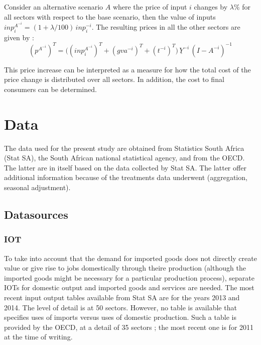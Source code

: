\documentclass[12pt,english]{article}
\begin{document}
Consider an alternative scenario $A$ where the price of input $i$ changes by $\lambda\%$ for all sectors with respect to the base scenario, then the value of inputs $inp^{A^{-i}}_{i} = (1+\lambda/100)\, inp^{-i}_i$. The resulting prices in all the other sectors are given by :
\begin{equation}
(p^{A^{-i}})^T  =  \Big((inp^{A^{-i}}_i)^T + (gva^{-i})^T + (t^{-i})^T \Big)\, \underline{Y}^{-i} \, (I - A^{-i})^{-1} \label{cost-push-scen}
\end{equation}

This price increase can be interpreted as a measure for how the total cost of the price change is distributed over all sectors. In addition, the cost to final consumers can be determined. 





\section{Data}

The data used for the present study are obtained from Statistics South Africa (Stat SA), the South African national statistical agency, and from the OECD. The latter are in itself based on the data collected by Stat SA. The latter offer additional information because of the treatments data underwent (aggregation, seasonal adjustment). %

\subsection{Datasources}

\subsubsection{IOT}	

To take into account that the demand for imported goods does not directly create value or give rise to jobs domestically through theire production (although the imported goods might be necessary for a particular production process), separate IOTs for domestic output and imported goods and services are needed. The most recent input output tables available from Stat SA are for the years 2013 and 2014. The level of detail is at 50 sectors. However, no table is available that specifies uses of imports versus uses of domestic production. Such a table is provided by the OECD, at a detail of 35 sectors ; the most recent one is for 2011 at the time of writing.
\end{document}
